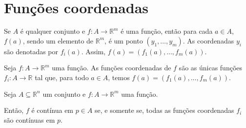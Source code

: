 \section{Funções coordenadas}
Se $A$ é qualquer conjunto e $f: A \to \mathbb R^m$ é uma função, então para cada $a \in A$, $f(a)$, sendo um elemento de $\mathbb R^m$, é um ponto $(y_1, \dots, y_m)$.
As coordenadas $y_i$ são denotadas por $f_i(a)$.
Assim, $f(a) = (f_1(a), \dots, f_m(a))$.

\begin{definition}
    Seja $f: A \to \mathbb R^m$ uma função.
    As funções coordenadas de $f$ são as únicas funções $f_i: A \to \mathbb R$ tal que, para todo $a \in A$, temos $f(a) = (f_1(a), \dots, f_m(a))$.
\end{definition}

\begin{proposition}
    Seja $A\subseteq \mathbb R^n$ um conjunto e $f: A \to \mathbb R^m$ uma função.

    Então, $f$ é contínua em $p \in A$ se, e somente se, todas as funções coordenadas $f_i$ são contínuas em $p$.
\end{proposition}

